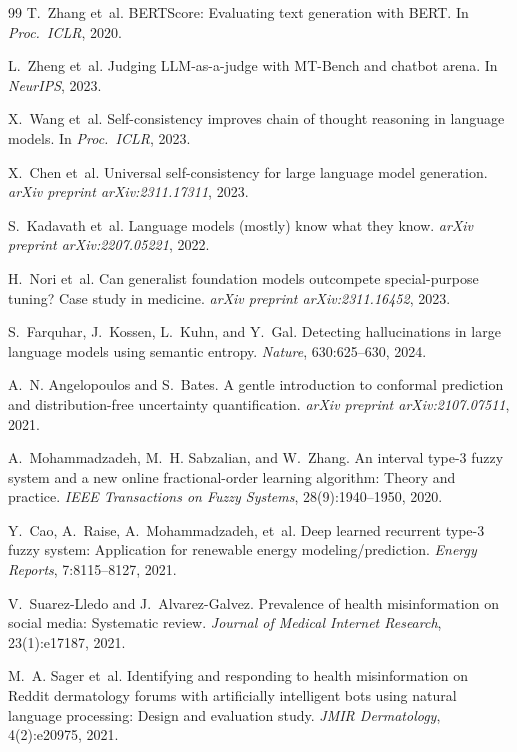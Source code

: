 \documentclass[11pt]{article}
\begin{document}
\begin{thebibliography}{99}
T.~Zhang et~al.
\newblock BERTScore: Evaluating text generation with BERT.
\newblock In \emph{Proc.\ ICLR}, 2020.

L.~Zheng et~al.
\newblock Judging LLM-as-a-judge with MT-Bench and chatbot arena.
\newblock In \emph{NeurIPS}, 2023.

X.~Wang et~al.
\newblock Self-consistency improves chain of thought reasoning in language
models.
\newblock In \emph{Proc.\ ICLR}, 2023.

X.~Chen et~al.
\newblock Universal self-consistency for large language model generation.
\newblock \emph{arXiv preprint arXiv:2311.17311}, 2023.

S.~Kadavath et~al.
\newblock Language models (mostly) know what they know.
\newblock \emph{arXiv preprint arXiv:2207.05221}, 2022.

H.~Nori et~al.
\newblock Can generalist foundation models outcompete special-purpose tuning?
Case study in medicine.
\newblock \emph{arXiv preprint arXiv:2311.16452}, 2023.

S.~Farquhar, J.~Kossen, L.~Kuhn, and Y.~Gal.
\newblock Detecting hallucinations in large language models using semantic
entropy.
\newblock \emph{Nature}, 630:625--630, 2024.

A.~N. Angelopoulos and S.~Bates.
\newblock A gentle introduction to conformal prediction and distribution-free
uncertainty quantification.
\newblock \emph{arXiv preprint arXiv:2107.07511}, 2021.

A.~Mohammadzadeh, M.~H. Sabzalian, and W.~Zhang.
\newblock An interval type-3 fuzzy system and a new online fractional-order
learning algorithm: Theory and practice.
\newblock \emph{IEEE Transactions on Fuzzy Systems}, 28(9):1940--1950, 2020.

Y.~Cao, A.~Raise, A.~Mohammadzadeh, et~al.
\newblock Deep learned recurrent type-3 fuzzy system: Application for renewable
energy modeling/prediction.
\newblock \emph{Energy Reports}, 7:8115--8127, 2021.

V.~Suarez-Lledo and J.~Alvarez-Galvez.
\newblock Prevalence of health misinformation on social media: Systematic
review.
\newblock \emph{Journal of Medical Internet Research}, 23(1):e17187, 2021.

M.~A. Sager et~al.
\newblock Identifying and responding to health misinformation on Reddit
dermatology forums with artificially intelligent bots using natural language
processing: Design and evaluation study.
\newblock \emph{JMIR Dermatology}, 4(2):e20975, 2021.

\end{thebibliography}
\end{document}
